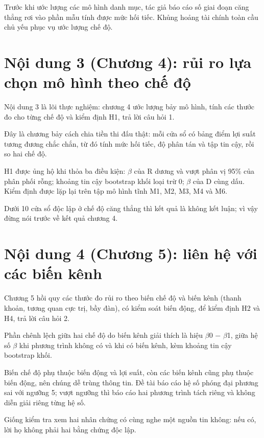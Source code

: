 Trước khi ước lượng các mô hình danh mục, tác giả báo cáo số giai đoạn căng thẳng rơi vào phần mẫu tính được mức hối tiếc. Khủng hoảng tài chính toàn cầu chủ yếu phục vụ ước lượng chế độ.

\section{Nội dung 3 (Chương 4): rủi ro lựa chọn mô hình theo chế độ}

Nội dung 3 là lõi thực nghiệm: chương 4 ước lượng bảy mô hình, tính các thước đo cho từng chế độ và kiểm định H1, trả lời câu hỏi 1.

Đây là chương bảy cách chia tiền thi đấu thật: mỗi cửa sổ có bảng điểm lợi suất tương đương chắc chắn, từ đó tính mức hối tiếc, độ phân tán và tập tin cậy, rồi so hai chế độ.

H1 được ủng hộ khi thỏa ba điều kiện: \texorpdfstring{$\beta$}{beta} của R dương và vượt phân vị 95\% của phân phối rỗng; khoảng tin cậy bootstrap khối loại trừ 0; \texorpdfstring{$\beta$}{beta} của D cùng dấu. Kiểm định được lặp lại trên tập mô hình tĩnh M1, M2, M3, M4 và M6.

Dưới 10 cửa sổ độc lập ở chế độ căng thẳng thì kết quả là không kết luận; vì vậy đừng nói trước về kết quả chương 4.

\section{Nội dung 4 (Chương 5): liên hệ với các biến kênh}

Chương 5 hồi quy các thước đo rủi ro theo biến chế độ và biến kênh (thanh khoản, tương quan cực trị, bầy đàn), có kiểm soát biến động, để kiểm định H2 và H4, trả lời câu hỏi 2.

Phần chênh lệch giữa hai chế độ do biến kênh giải thích là hiệu \texorpdfstring{$\beta$}{beta}0 − \texorpdfstring{$\beta$}{beta}1, giữa hệ số \texorpdfstring{$\beta$}{beta} khi phương trình không có và khi có biến kênh, kèm khoảng tin cậy bootstrap khối.

Biến chế độ phụ thuộc biến động và lợi suất, còn các biến kênh cũng phụ thuộc biến động, nên chúng dễ trùng thông tin. Đề tài báo cáo hệ số phóng đại phương sai với ngưỡng 5; vượt ngưỡng thì báo cáo hai phương trình tách riêng và không diễn giải riêng từng hệ số.

Giống kiểm tra xem hai nhân chứng có cùng nghe một nguồn tin không: nếu có, lời họ không phải hai bằng chứng độc lập.

